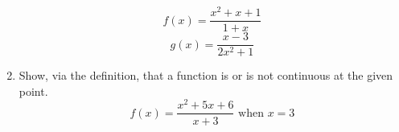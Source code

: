 \documentclass{exam}
\begin{document}
\begin{enumerate}
$$f(x) = \frac{x^2 + x + 1}{1+x}$$
$$g(x) = \frac{x-3}{2x^2 + 1}$$
\item Show, via the definition, that a function is or is not continuous at the given point.\\
$$f(x) = \frac{x^2 + 5x + 6}{x + 3} \mbox{ when } x = 3$$


\end{enumerate}
\end{document}
